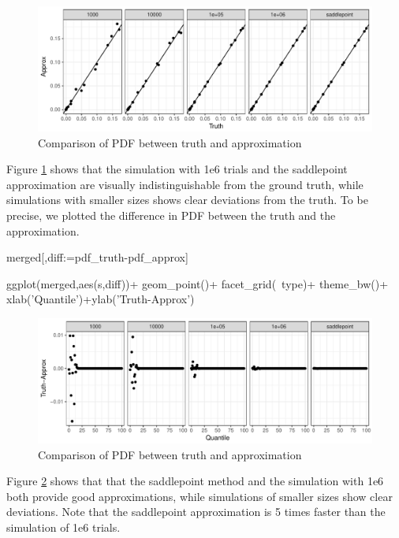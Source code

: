 \begin{figure}[h]
\includegraphics[width=\textwidth]{health_monitor_truth_vs_approx_pdf.pdf}
\caption{Comparison of PDF between truth and approximation}
\label{fig:5}
\end{figure}

Figure \ref{fig:5} shows that the simulation with 1e6 trials and the saddlepoint approximation are visually indistinguishable from the ground truth, while simulations with smaller sizes shows clear deviations from the truth. To be precise, we plotted the difference in PDF between the truth and the approximation.

\begin{example}
merged[,diff:=pdf_truth-pdf_approx]

ggplot(merged,aes(s,diff))+
	geom_point()+
	facet_grid(~type)+
	theme_bw()+
	xlab('Quantile')+ylab('Truth-Approx')
\end{example}

\begin{figure}[h]
\includegraphics[width=\textwidth]{health_monitor_truth_minus_approx_pdf.pdf}
\caption{Comparison of PDF between truth and approximation}
\label{fig:6}
\end{figure}

Figure \ref{fig:6} shows that that the saddlepoint method and the simulation with 1e6 both provide good approximations, while simulations of smaller sizes show clear deviations. Note that the saddlepoint approximation is 5 times faster than the simulation of 1e6 trials.

